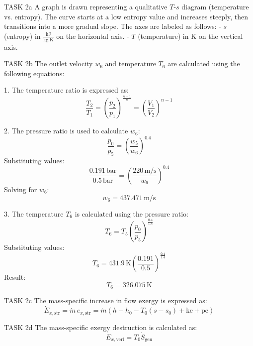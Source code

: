 TASK 2a  
A graph is drawn representing a qualitative \( T \)-\( s \) diagram (temperature vs. entropy). The curve starts at a low entropy value and increases steeply, then transitions into a more gradual slope. The axes are labeled as follows:  
- \( s \) (entropy) in \( \frac{\text{kJ}}{\text{kg·K}} \) on the horizontal axis.  
- \( T \) (temperature) in \( \text{K} \) on the vertical axis.  

TASK 2b  
The outlet velocity \( w_6 \) and temperature \( T_6 \) are calculated using the following equations:  

1. The temperature ratio is expressed as:  
\[
\frac{T_2}{T_1} = \left( \frac{p_2}{p_1} \right)^{\frac{n-1}{n}} = \left( \frac{V_1}{V_2} \right)^{n-1}
\]  

2. The pressure ratio is used to calculate \( w_6 \):  
\[
\frac{p_0}{p_5} = \left( \frac{w_5}{w_6} \right)^{0.4}
\]  
Substituting values:  
\[
\frac{0.191 \, \text{bar}}{0.5 \, \text{bar}} = \left( \frac{220 \, \text{m/s}}{w_6} \right)^{0.4}
\]  
Solving for \( w_6 \):  
\[
w_6 = 437.471 \, \text{m/s}
\]  

3. The temperature \( T_6 \) is calculated using the pressure ratio:  
\[
T_6 = T_5 \left( \frac{p_0}{p_5} \right)^{\frac{0.4}{1.4}}
\]  
Substituting values:  
\[
T_6 = 431.9 \, \text{K} \left( \frac{0.191}{0.5} \right)^{\frac{0.4}{1.4}}
\]  
Result:  
\[
T_6 = 326.075 \, \text{K}
\]  

TASK 2c  
The mass-specific increase in flow exergy is expressed as:  
\[
\dot{E}_{x,\text{str}} = \dot{m} \, e_{x,\text{str}} = \dot{m} \left( h - h_0 - T_0 (s - s_0) + \text{ke} + \text{pe} \right)
\]  

TASK 2d  
The mass-specific exergy destruction is calculated as:  
\[
\dot{E}_{x,\text{verl}} = T_0 \dot{S}_{\text{gen}}
\]  